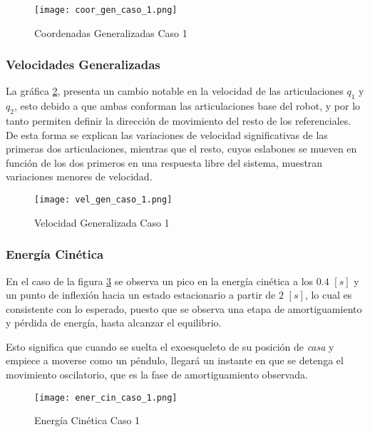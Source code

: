     \begin{figure} [H]%
            \centering
            \texttt{[image: coor\_gen\_caso\_1.png]} 
        \caption{Coordenadas Generalizadas Caso 1}
        \label{fig:CoordGenC1}
    \end{figure}

    \subsubsection{Velocidades Generalizadas}
    \noindent La gráfica \ref{fig:VelGenC1}, presenta un cambio notable en la velocidad 
    de las articulaciones $q_1$ y $q_2$, esto debido a que ambas conforman 
    las articulaciones base del robot, y por lo tanto permiten definir la dirección 
    de movimiento del resto de los referenciales. De esta forma se explican las 
    variaciones de velocidad significativas de las primeras dos articulaciones, 
    mientras que el resto, cuyos eslabones se mueven en función de los dos primeros 
    en una respuesta libre del sistema, muestran variaciones menores de velocidad.

    \begin{figure}[H]%
            \centering
            \texttt{[image: vel\_gen\_caso\_1.png]} 
        \caption{Velocidad Generalizada Caso 1}
        \label{fig:VelGenC1}
    \end{figure}

    \subsubsection{Energía Cinética}
    \noindent En el caso de la figura \ref{fig:eCinC1} se observa un pico en la energía 
    cinética a los $0.4$ $[s]$ y un punto de inflexión hacia un estado estacionario 
    a partir de $2$ $[s]$, lo cual 
    es consistente con lo esperado, puesto que se observa una etapa de 
    amortiguamiento y pérdida de energía, hasta alcanzar el equilibrio. 
    
    Esto significa 
    que cuando se suelta el exoesqueleto de su posición de \emph{casa} y 
    empiece a moverse como un péndulo, llegará un instante en que se detenga el 
    movimiento oscilatorio, que es la fase de amortiguamiento observada.

    \begin{figure}[H]%
            \centering
            \texttt{[image: ener\_cin\_caso\_1.png]} 
        \caption{Energía Cinética Caso 1}
        \label{fig:eCinC1}
    \end{figure}

